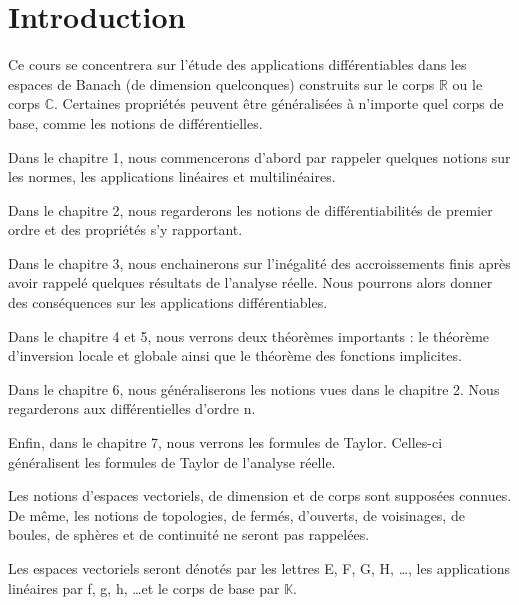 \chapter*{Introduction}

Ce cours se concentrera sur l'étude des applications différentiables dans les
espaces de Banach (de dimension quelconques) construits sur le corps
$\mathbb{R}$ ou le corps $\mathbb{C}$.  Certaines propriétés peuvent être
généralisées à n'importe quel corps de base, comme les notions de
différentielles.

Dans le chapitre 1, nous commencerons d'abord par rappeler quelques notions sur
les normes, les applications linéaires et multilinéaires.

Dans le chapitre 2, nous regarderons les notions de différentiabilités de
premier ordre et des propriétés s'y rapportant.

Dans le chapitre 3, nous enchainerons sur l'inégalité des accroissements finis après
avoir rappelé quelques résultats de l'analyse réelle. Nous pourrons alors donner
des conséquences sur les applications différentiables.

Dans le chapitre 4 et 5, nous verrons deux théorèmes importants : le théorème
d'inversion locale et globale ainsi que le théorème des fonctions implicites.

Dans le chapitre 6, nous généraliserons les notions vues dans le chapitre 2.
Nous regarderons aux différentielles d'ordre n.

Enfin, dans le chapitre 7, nous verrons les formules de Taylor. Celles-ci
généralisent les formules de Taylor de l'analyse réelle.

Les notions d'espaces vectoriels, de dimension et de corps sont supposées
connues. De même, les notions de topologies, de fermés, d'ouverts, de
voisinages, de boules, de sphères et de continuité ne seront pas rappelées.

Les espaces vectoriels seront dénotés par les lettres E, F, G, H, \ldots, les
applications linéaires par f, g, h, \ldots et le corps de base par $\mathbb{K}$.
